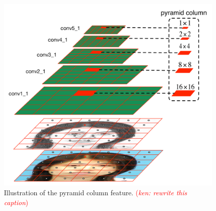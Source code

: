 \documentclass[10pt,twocolumn,letterpaper]{article}
\newcommand\ken[1]{{\small \textcolor{red}{(\emph{ken: #1})}}}
\begin{document}
\begin{figure}[htbp]
\centering
\includegraphics[width=0.85\linewidth]{img/pyramidcolumn.pdf}
\caption{Illustration of the pyramid column feature. \ken{rewrite this caption}}
\label{fig:pyramidcolumn}
\end{figure}

\end{document}
